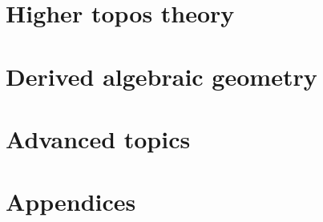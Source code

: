 \documentclass[a4paper]{memoir}
\theoremstyle{definition}
\theoremstyle{definition}
\theoremstyle{remark}
\begin{document}
\part{Higher topos theory}



\part{Derived algebraic geometry}




\part{Advanced topics}





\appendix

\part*{Appendices}



\end{document}
